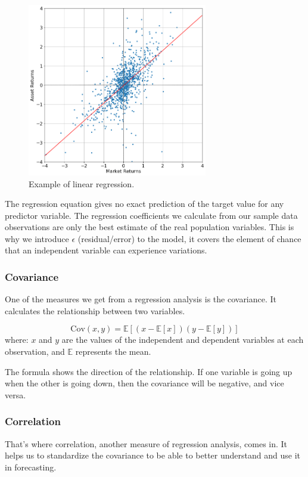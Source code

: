 \begin{figure}[htbp]
	\centering
	\includegraphics[width=0.7\textwidth]{figures/linear_regression}
	\caption{Example of linear regression.}
	\label{fig:linear_regression_example}
\end{figure}

The regression equation gives no exact prediction of the target value for any predictor variable. The regression coefficients we calculate from our sample data observations are only the best estimate of the real population variables.
This is why we introduce $\epsilon$ (residual/error) to the model, it covers the element of chance that an independent variable can experience variations.

\subsubsection{Covariance}
One of the measures we get from a regression analysis is the covariance. It calculates the relationship between two variables.

\begin{equation}
\text{Cov}(x, y) = \mathbb{E}[(x - \mathbb{E}[x])(y - \mathbb{E}[y])]
\end{equation}
where: $x$ and $y$ are the values of the independent and dependent variables at each observation, and $\mathbb{E}$ represents the mean.

The formula shows the direction of the relationship. If one variable is going up when the other is going down, then the covariance will be negative, and vice versa.

\subsubsection{Correlation}
That’s where correlation, another measure of regression analysis, comes in. It helps us to standardize the covariance to be able to better understand and use it in forecasting.

